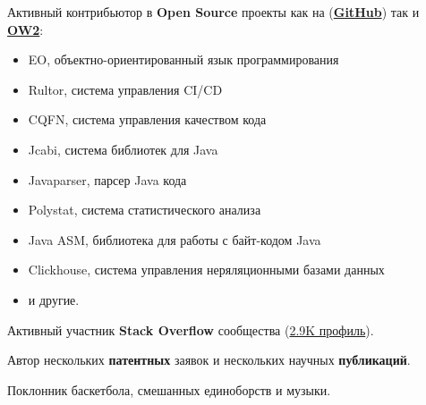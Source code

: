 \documentclass{vl}
\begin{document}
    Активный контрибьютор в \textbf{Open Source} проекты как
    на (\textbf{\href{https://github.com/volodya-lombrozo}{GitHub}})
    так и \textbf{\href{https://gitlab.ow2.org/lombrozo}{OW2}}:
    \begin{itemize}
        \item EO, объектно-ориентированный язык программирования
        \item Rultor, система управления CI/CD
        \item CQFN, система управления качеством кода
        \item Jcabi, система библиотек для Java
        \item Javaparser, парсер Java кода
        \item Polystat, система статистического анализа
        \item Java ASM, библиотека для работы с байт-кодом Java
        \item Clickhouse, система управления неряляционными базами данных
        \item и другие.
    \end{itemize}

    Активный участник \textbf{Stack Overflow} сообщества
    (\href{https://stackoverflow.com/users/10423604/volodya-lombrozo}{2.9K профиль}).

    Автор нескольких \textbf{патентных} заявок и нескольких научных \textbf{публикаций}.

    Поклонник
    баскетбола,
    смешанных единоборств
    и музыки.
\end{document}
